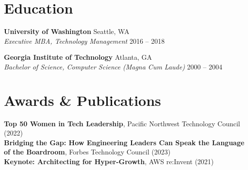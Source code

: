 \documentclass[11pt,letterpaper]{article}
\begin{document}
\section{Education}
\textbf{University of Washington} \hfill Seattle, WA \\
\textit{Executive MBA, Technology Management} \hfill 2016 -- 2018

\textbf{Georgia Institute of Technology} \hfill Atlanta, GA \\
\textit{Bachelor of Science, Computer Science (Magna Cum Laude)} \hfill 2000 -- 2004

\section{Awards \& Publications}
\textbf{Top 50 Women in Tech Leadership}, Pacific Northwest Technology Council (2022) \\
\textbf{Bridging the Gap: How Engineering Leaders Can Speak the Language of the Boardroom}, Forbes Technology Council (2023) \\
\textbf{Keynote: Architecting for Hyper-Growth}, AWS re:Invent (2021)
\end{document}

